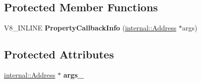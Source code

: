 \subsection*{Protected Member Functions}
\begin{DoxyCompactItemize}
\item 
\mbox{\label{classv8_1_1PropertyCallbackInfo_af1ab54236cc838166b2c3855488cb7ad}} 
V8\+\_\+\+I\+N\+L\+I\+NE {\bfseries Property\+Callback\+Info} (\mbox{\hyperlink{classuintptr__t}{internal\+::\+Address}} $\ast$args)
\end{DoxyCompactItemize}
\subsection*{Protected Attributes}
\begin{DoxyCompactItemize}
\item 
\mbox{\label{classv8_1_1PropertyCallbackInfo_af78f4466d1014cb3304589570f2d1fce}} 
\mbox{\hyperlink{classuintptr__t}{internal\+::\+Address}} $\ast$ {\bfseries args\+\_\+}
\end{DoxyCompactItemize}
